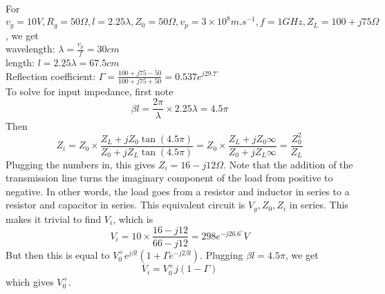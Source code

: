 \documentclass[12pt]{article}
\begin{document}
\begin{ex}
    For $v_g = 10\unit{V}, R_g = 50\unit{\Omega}, l = 2.25 \lambda, Z_0 = 50\unit{\Omega}, v_p = 3 \times 10^8 \unit{m.s^{-1}}, f = 1\unit{GHz}, Z_L = 100 + j75 \unit{\Omega}$, we get \\
    wavelength: $\lambda = \frac{v_p}{f} = 30\unit{cm}$ \\
    length: $l = 2.25\lambda = 67.5\unit{cm}$ \\
    Reflection coefficient: $\Gamma = \frac{100 + j75 - 50}{100 + j75 + 50} = 0.537e^{j29.7^\circ}$ \\
    To solve for input impedance, first note
    $$\beta l = \frac{2\pi}{\lambda} \times 2.25 \lambda = 4.5 \pi$$
    Then
    $$Z_i = Z_0 \times \frac{Z_L + jZ_0\tan(4.5\pi)}{Z_0 + jZ_L\tan(4.5\pi)} = Z_0 \times \frac{Z_L + jZ_0\infty}{Z_0 + jZ_L\infty} = \frac{Z_0^2}{Z_L}$$
    Plugging the numbers in, this gives $Z_i = 16 - j12\unit{\Omega}$. Note that the addition of the transmission line turns the imaginary component of the load from positive to negative. In other words, the load goes from a resistor and inductor in series to a resistor and capacitor in series. This equivalent circuit is $V_g, Z_0, Z_i$ in series. This makes it trivial to find $V_i$, which is
    $$V_i = 10 \times \frac{16 - j12}{66 - j12} = 298 e^{-j26.6^\circ}\unit{V}$$
    But then this is equal to $V_0^+ e^{j\beta l}(1 + \Gamma e^{-j2\beta l})$. Plugging $\beta l = 4.5\pi$, we get
    $$V_i = V_0^+j(1-\Gamma)$$
    which gives $V_0^+$.
\end{ex}
\end{document}
